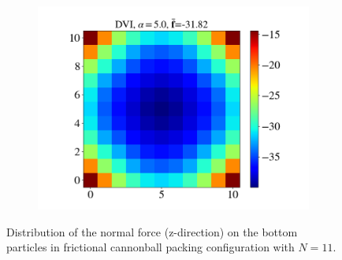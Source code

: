 \begin{itemize}
\begin{figure}[H]
\begin{subfigure}{0.32\columnwidth}
			\includegraphics[width=1.0\textwidth]{images/CD/Example7/10/N_11_DVI_5.0.png}
		\end{subfigure}
		\caption{Distribution of the normal force (z-direction) on the bottom particles in frictional cannonball packing configuration with $N=11$.}\label{fig:cbp_fp_N=11}
	\end{figure}
	

\end{itemize}
